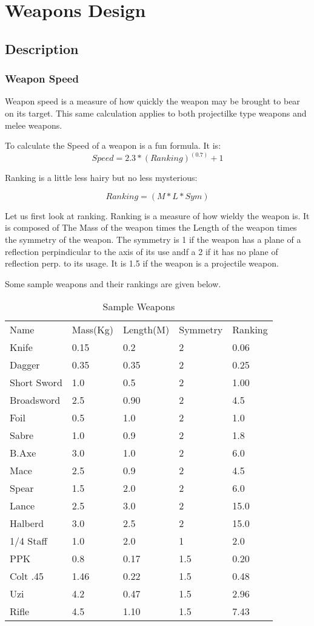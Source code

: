 \chapter{Weapons Design}

\section{Description}
\subsection{Weapon Speed}
Weapon speed is a measure of how quickly the weapon may be brought 
to bear on its target. This same calculation applies to both 
projectilke type weapons and melee weapons.

To calculate the Speed of a weapon is a fun formula. It is:
\[Speed = 2.3*(Ranking)^{(0.7)}+1\]

Ranking is a little less hairy but no less mysterious:

\[Ranking = (M*L*Sym)\]

Let us first look at ranking. Ranking is a measure of how wieldy the 
weapon is. It is composed of The Mass of the weapon times the Length 
of the weapon times the symmetry of the weapon. The symmetry is 1 if 
the weapon has a plane of a reflection perpindicular to the axis of 
its use andf a 2 if it has no plane of reflection perp. to its usage.
It is 1.5 if the weapon is a projectile weapon.

Some sample weapons and their rankings are given below.

\begin{table}[h]
\centering
\caption{Sample Weapons}
	\begin{tabular}{lllll} \hline
	Name      & Mass(Kg) & Length(M) & Symmetry & Ranking \\ 
	Knife	  & 0.15     & 0.2       & 2     & 0.06 \\
	Dagger    & 0.35     & 0.35	     & 2	 & 0.25 \\
	Short Sword	& 1.0	 & 0.5	     & 2     & 1.00 \\
	Broadsword	& 2.5    & 	0.90	 & 2     & 4.5 \\
	Foil	  &	0.5		&	1.0		&	2	&	1.0 \\
	Sabre	  &	1.0		&	0.9		&	2	&	1.8 \\
	B.Axe	  &	3.0		&	1.0		&	2	&	6.0 \\
	Mace	  &	2.5		&	0.9		&	2	&	4.5 \\
	Spear	  &	1.5		&	2.0		&	2	&	6.0 \\
	Lance	  &	2.5		&	3.0		&	2	&	15.0\\
	Halberd	  &	3.0		&	2.5		&	2	&	15.0 \\
	1/4 Staff &	1.0		&	2.0		&	1	&	2.0  \\
	PPK		 &	0.8		&	0.17	&	1.5	&	0.20 \\
	Colt .45 &	1.46	&	0.22	&	1.5	&	0.48 \\
	Uzi		 &	4.2		&	0.47	&	1.5	&	2.96 \\
	Rifle	 &	4.5		&	1.10	&	1.5	&	7.43 \\ \hline
	\end{tabular}
\end{table}

